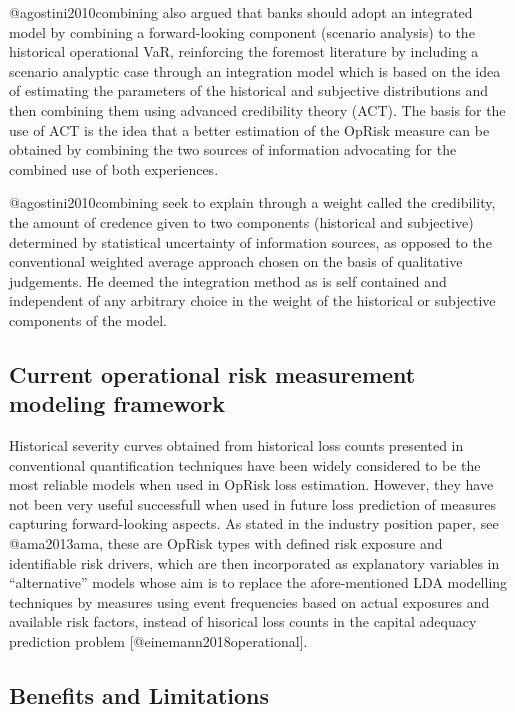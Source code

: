 \documentclass[]{article}
\begin{document}
@agostini2010combining also argued that banks should adopt an integrated
model by combining a forward-looking component (scenario analysis) to
the historical operational VaR, reinforcing the foremost literature by
including a scenario analyptic case through an integration model which
is based on the idea of estimating the parameters of the historical and
subjective distributions and then combining them using advanced
credibility theory (ACT). The basis for the use of ACT is the idea that
a better estimation of the OpRisk measure can be obtained by combining
the two sources of information advocating for the combined use of both
experiences.\medskip

@agostini2010combining seek to explain through a weight called the
credibility, the amount of credence given to two components (historical
and subjective) determined by statistical uncertainty of information
sources, as opposed to the conventional weighted average approach chosen
on the basis of qualitative judgements. He deemed the integration method
as is self contained and independent of any arbitrary choice in the
weight of the historical or subjective components of the model.

\subsection{Current operational risk measurement modeling framework}
\label{sec:Current operational risk measurement modeling framework}

Historical severity curves obtained from historical loss counts
presented in conventional quantification techniques have been widely
considered to be the most reliable models when used in OpRisk loss
estimation. However, they have not been very useful successfull when
used in future loss prediction of measures capturing forward-looking
aspects. As stated in the industry position paper, see @ama2013ama,
these are OpRisk types with defined risk exposure and identifiable risk
drivers, which are then incorporated as explanatory variables in
``alternative'' models whose aim is to replace the afore-mentioned LDA
modelling techniques by measures using event frequencies based on actual
exposures and available risk factors, instead of hisorical loss counts
in the capital adequacy prediction problem
{[}@einemann2018operational{]}.

\subsection{Benefits and Limitations}
\label{ssec:Benefits and Limitations}
\end{document}

